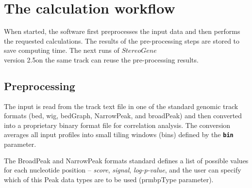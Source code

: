 \documentclass{article}
\newcommand{\prm}[1]{\texttt{\textbf{{#1}}}}
\newcommand{\sg}{$StereoGene$\\ version 2.5}
\begin{document}
\section{The calculation workflow}
When started, the software first preprocesses the input data and then performs the requested calculations. The results of the pre-processing steps are stored to save computing time. The next runs of \sg on the same track can reuse the pre-processing results.

\subsection{Preprocessing}
The input is read from the track text file in one of the standard genomic track formats (bed, wig, bedGraph, NarrowPeak, and broadPeak) and then converted into a proprietary binary format file for correlation analysis. The conversion averages all input profiles into small tiling windows (bins) defined by the \prm{bin} parameter. 

The BroadPeak and NarrowPeak formats standard defines a list of possible values for each nucleotide position -- \textit{score}, \textit{signal}, \textit{log-p-value}, and the user can specify which of this Peak data types are to be used (prm{bpType} parameter). 
\end{document}
